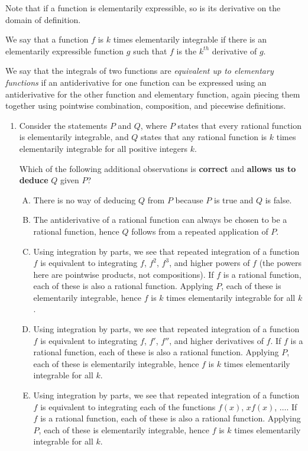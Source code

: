 \documentclass[10pt]{amsart}
\begin{document}
Note that if a function is elementarily expressible, so is its
derivative on the domain of definition.

We say that a function $f$ is $k$ times elementarily integrable if
there is an elementarily expressible function $g$ such that $f$ is the
$k^{th}$ derivative of $g$.

We say that the integrals of two functions are {\em equivalent up to
elementary functions} if an antiderivative for one function can be
expressed using an antiderivative for the other function and
elementary function, again piecing them together using pointwise
combination, composition, and piecewise definitions.

\begin{enumerate}
\item Consider the statements $P$ and $Q$, where $P$ states that every
  rational function is elementarily integrable, and $Q$ states that
  any rational function is $k$ times elementarily integrable for all
  positive integers $k$.

  Which of the following additional observations is {\bf correct} and
  {\bf allows us to deduce} $Q$ given $P$?

  \begin{enumerate}[(A)]
  \item There is no way of deducing $Q$ from $P$ because $P$ is true
    and $Q$ is false.
  \item The antiderivative of a rational function can always be chosen
    to be a rational function, hence $Q$ follows from a repeated
    application of $P$.
  \item Using integration by parts, we see that repeated integration
    of a function $f$ is equivalent to integrating $f$, $f^2$, $f^3$,
    and higher powers of $f$ (the powers here are pointwise products,
    not compositions). If $f$ is a rational function, each of these is
    also a rational function. Applying $P$, each of these is
    elementarily integrable, hence $f$ is $k$ times elementarily
    integrable for all $k$.
  \item Using integration by parts, we see that repeated integration
    of a function $f$ is equivalent to integrating $f$, $f'$, $f''$,
    and higher derivatives of $f$. If $f$ is a rational function, each
    of these is also a rational function. Applying $P$, each of these
    is elementarily integrable, hence $f$ is $k$ times elementarily
    integrable for all $k$.
  \item Using integration by parts, we see that repeated integration
    of a function $f$ is equivalent to integrating each of the
    functions $f(x)$, $xf(x)$, $\dots$. If $f$ is a rational function,
    each of these is also a rational function. Applying $P$, each of
    these is elementarily integrable, hence $f$ is $k$ times
    elementarily integrable for all $k$.
  \end{enumerate}


\end{enumerate}
\end{document}
